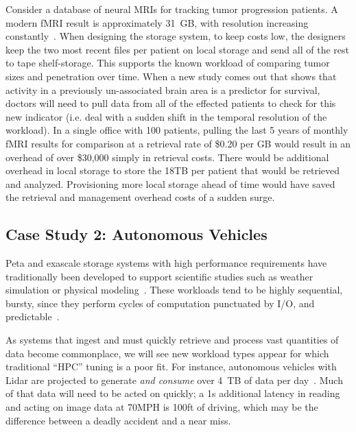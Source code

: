 Consider a
database of neural MRIs for tracking tumor progression patients.  A modern fMRI
result is approximately 31~GB, with resolution increasing
constantly~\cite{hanke2014high}. When designing the storage system,
to keep costs low, the designers keep the two most recent files per patient on local
storage and send all of the rest to tape shelf-storage.  This supports the known
workload of comparing tumor sizes and penetration over time.  When a new study
comes out that shows that activity in a previously un-associated brain area is a
predictor for survival, doctors will need to pull data from all of the effected
patients to check for this new indicator (i.e. deal with a sudden shift in the
temporal resolution of the workload).  In a single office with 100 patients,
pulling the last 5 years of monthly fMRI results for comparison at a retrieval
rate of \$0.20 per GB would result in an overhead of over \$30,000 simply in
retrieval costs.  There would be additional overhead in local storage to store
the 18TB per patient that would be retrieved and analyzed.  Provisioning more
local storage ahead of time would have saved the retrieval and management
overhead costs of a sudden surge.    

\subsection{Case Study 2: Autonomous Vehicles}
Peta and exascale storage systems with high performance requirements have
traditionally been developed to support scientific studies such as weather
simulation or physical modeling~\cite{miyoshi2016big,maeno2014evolution}.  These workloads tend to be highly
sequential, bursty, since they perform cycles of computation punctuated by I/O,
and predictable~\cite{liufast14}.  

As systems that ingest and must quickly retrieve and process vast quantities of
data become commonplace, we will see new workload types appear for which traditional
``HPC'' tuning is a poor fit.  For instance, autonomous vehicles with Lidar
are projected to generate \textit{and consume} over 4~TB of data per
day~\cite{selfdrivingcars}.  Much of that data will need to be acted on quickly; a 1s
additional latency in reading and acting on image data at 70MPH is 100ft of driving, which may be the difference
between a deadly accident and a near miss. 
%

%

